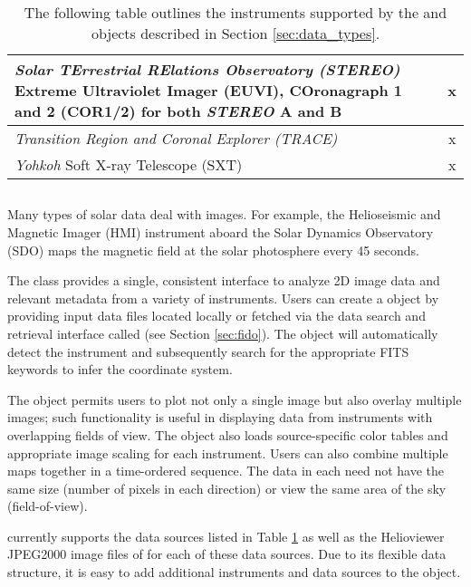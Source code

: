 \begin{table}
\begin{center}
\begin{tabular}{|p{10cm}|c|c|}
\hline
\textit{Solar TErrestrial RElations Observatory (STEREO)} Extreme Ultraviolet Imager (EUVI), COronagraph 1 and 2 (COR1/2) for both \textit{STEREO} A and B \citep{howard2008sun} & & x \\
\hline
\textit{Transition Region and Coronal Explorer (TRACE)} \citep{handy99} & & x \\
\hline
\textit{Yohkoh} Soft X-ray Telescope (SXT) \citep{tsuneta1991soft} & & x \\
\hline
\end{tabular}
\end{center}
\caption{The following table outlines the instruments supported by the \Timeseries and \Map objects described in Section \ref{sec:data_types}.}
\label{tab:instruments}
\end{table}

\subsection{\Map}
\label{sec:map}
Many types of solar data deal with images. For example, the Helioseismic and Magnetic Imager (HMI) instrument aboard the Solar Dynamics Observatory (SDO) maps the magnetic field at the solar photosphere every 45 seconds. 

The \Map class provides a single, consistent interface to analyze 2D image data and relevant metadata from a variety of instruments. 
Users can create a \Map object by providing input data files located locally or fetched via the \sunpypkg data search and retrieval interface called \Fido (see Section \ref{sec:fido}). The \Map object will automatically detect the instrument and subsequently search for the appropriate FITS keywords to infer the coordinate system.

The \Map object permits users to plot not only a single image but also overlay multiple images; such functionality is useful in displaying data from instruments with overlapping fields of view. The \Map object also loads source-specific color tables and appropriate image scaling for each instrument.
Users can also combine multiple maps together in a time-ordered sequence. The data in each \Map need not have the same size (number of pixels in each direction) or view the same area of the sky (field-of-view). 

\Map currently supports the data sources listed in Table \ref{tab:instruments} as well as the Helioviewer JPEG2000 image files of for each of these data sources. Due to its flexible data structure, it is easy to add additional instruments and data sources to the \Map object.